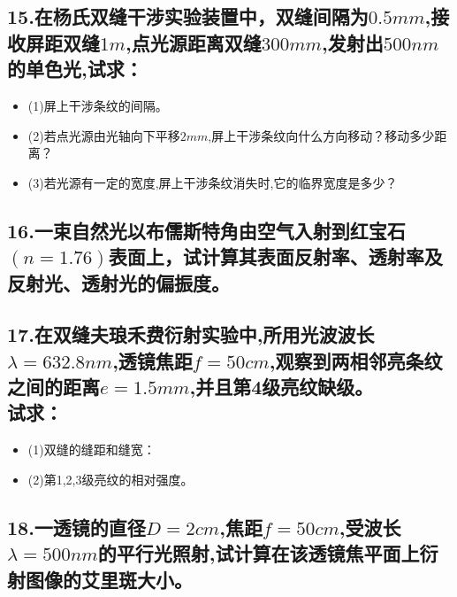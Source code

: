 \documentclass[11pt,a4paper]{article}
\begin{document}
    \subsection*{15.在杨氏双缝干涉实验装置中，双缝间隔为$0.5mm$,接收屏距双缝$1m$,点光源距离双缝$300mm$,发射出$500nm$的单色光,试求：}
    \begin{itemize}
        \vspace{-3mm}
        \item (1)屏上干涉条纹的间隔。
        \vspace{-3mm}
        \item (2)若点光源由光轴向下平移$2mm$,屏上干涉条纹向什么方向移动？移动多少距离？
        \vspace{-3mm}
        \item (3)若光源有一定的宽度,屏上干涉条纹消失时,它的临界宽度是多少？
    \end{itemize}
    \subsection*{16.一束自然光以布儒斯特角由空气入射到红宝石$(n=1.76)$表面上，试计算其表面反射率、透射率及反射光、透射光的偏振度。}
    \vspace{15mm}
    \subsection*{17.在双缝夫琅禾费衍射实验中,所用光波波长$\lambda =632.8nm$,透镜焦距$f=50cm$,观察到两相邻亮条纹之间的距离$e=1.5mm$,并且第4级亮纹缺级。\\试求：}
    \begin{itemize}
        \vspace{-3mm}
        \item (1)双缝的缝距和缝宽：
        \vspace{-3mm}
        \item (2)第1,2,3级亮纹的相对强度。
    \end{itemize}
    \vspace{15mm}
    \subsection*{18.一透镜的直径$D=2cm$,焦距$f=50cm$,受波长$\lambda =500nm$的平行光照射,试计算在该透镜焦平面上衍射图像的艾里斑大小。}
    \vspace{15mm}
\end{document}
